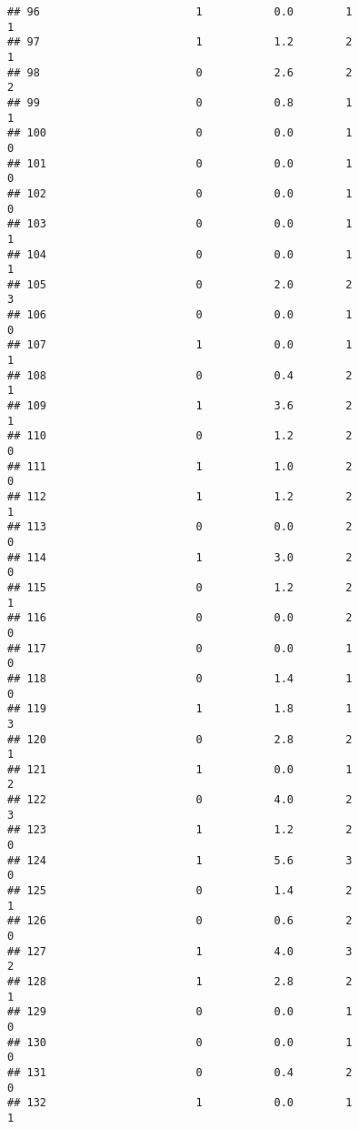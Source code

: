 \documentclass[]{article}
\begin{document}
\begin{verbatim}
## 96                        1           0.0        1                 1
## 97                        1           1.2        2                 1
## 98                        0           2.6        2                 2
## 99                        0           0.8        1                 1
## 100                       0           0.0        1                 0
## 101                       0           0.0        1                 0
## 102                       0           0.0        1                 0
## 103                       0           0.0        1                 1
## 104                       0           0.0        1                 1
## 105                       0           2.0        2                 3
## 106                       0           0.0        1                 0
## 107                       1           0.0        1                 1
## 108                       0           0.4        2                 1
## 109                       1           3.6        2                 1
## 110                       0           1.2        2                 0
## 111                       1           1.0        2                 0
## 112                       1           1.2        2                 1
## 113                       0           0.0        2                 0
## 114                       1           3.0        2                 0
## 115                       0           1.2        2                 1
## 116                       0           0.0        2                 0
## 117                       0           0.0        1                 0
## 118                       0           1.4        1                 0
## 119                       1           1.8        1                 3
## 120                       0           2.8        2                 1
## 121                       1           0.0        1                 2
## 122                       0           4.0        2                 3
## 123                       1           1.2        2                 0
## 124                       1           5.6        3                 0
## 125                       0           1.4        2                 1
## 126                       0           0.6        2                 0
## 127                       1           4.0        3                 2
## 128                       1           2.8        2                 1
## 129                       0           0.0        1                 0
## 130                       0           0.0        1                 0
## 131                       0           0.4        2                 0
## 132                       1           0.0        1                 1

\end{verbatim}
\end{document}
